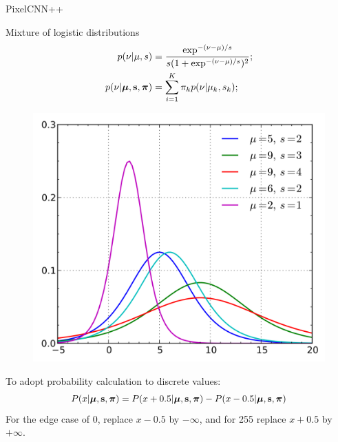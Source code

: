 \begin{frame}{PixelCNN++}
		\begin{minipage}[t]{0.55\columnwidth}
		\begin{block}{Mixture of logistic distributions}
			\begin{align*}
				p(\nu | \mu, s) &= \frac{\exp^{-(\nu - \mu) / s}}{s (1 + \exp^{-(\nu - \mu) / s})^2}; \\
				p(\nu | \boldsymbol{\mu}, \mathbf{s}, \boldsymbol{\pi}) &= \sum_{i=1}^K \pi_k p(\nu | \mu_k, s_k);
			\end{align*}
		\end{block}
		\end{minipage}%
		\begin{minipage}[t]{0.45\columnwidth}
				\begin{figure}
					\includegraphics[width=\linewidth]{figs/picelcnn++logistic}
				\end{figure}
		\end{minipage}
	To adopt probability calculation to discrete values:
	\[
		P(x | \boldsymbol{\mu}, \mathbf{s}, \boldsymbol{\pi}) = P(x + 0.5 | \boldsymbol{\mu}, \mathbf{s}, \boldsymbol{\pi}) - P(x - 0.5 | \boldsymbol{\mu}, \mathbf{s}, \boldsymbol{\pi})
	\]
	For the edge case of 0, replace $x - 0.5$ by $-\infty$, and for 255 replace $x + 0.5$ by $+\infty$.
\end{frame}
